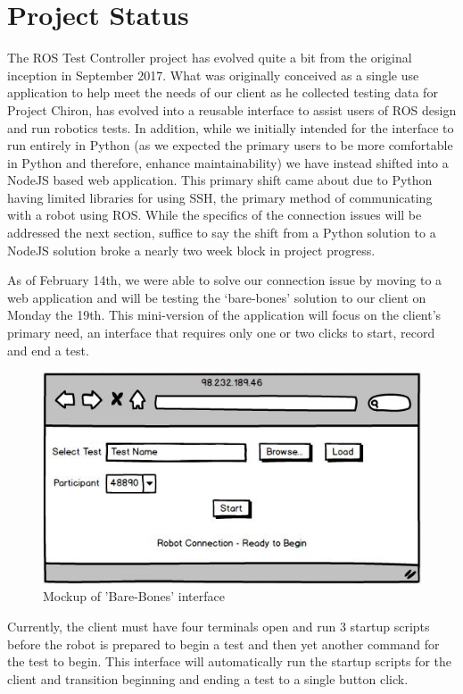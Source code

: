 \documentclass[onecolumn, draftclsnofoot,10pt, compsoc]{IEEEtran}
\begin{document}
\section{Project Status}
The ROS Test Controller project has evolved quite a bit from the original inception in September 2017. What was originally conceived as a single use application to help meet the needs of our client as he collected testing data for Project Chiron, has evolved into a reusable interface to assist users of ROS design and run robotics tests. In addition, while we initially intended for the interface to run entirely in Python (as we expected the primary users to be more comfortable in Python and therefore, enhance maintainability) we have instead shifted into a NodeJS based web application. This primary shift came about due to Python having limited libraries for using SSH, the primary method of communicating with a robot using ROS. While the specifics of the connection issues will be addressed the next section, suffice to say the shift from a Python solution to a NodeJS solution broke a nearly two week block in project progress. 

As of February 14th, we were able to solve our connection issue by moving to a web application and will be testing the ‘bare-bones’ solution to our client on Monday the 19th. This mini-version of the application will focus on the client’s primary need, an interface that requires only one or two clicks to start, record and end a test.

\begin{figure}[H]
	\centering
	\includegraphics[scale=0.6]{BarebonesMockup.jpg}
	\centering
	\caption{Mockup of 'Bare-Bones' interface}
\end{figure}

Currently, the client must have four terminals open and run 3 startup scripts before the robot is prepared to begin a test and then yet another command for the test to begin. This interface will automatically run the startup scripts for the client and transition beginning and ending a test to a single button click. 
\end{document}
